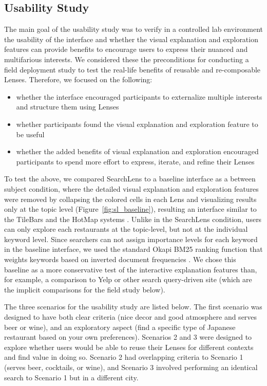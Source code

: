 \subsection{Usability Study}

The main goal of the usability study was to verify in a controlled lab environment the usability of the interface and whether the visual explanation and exploration features can provide benefits to encourage users to express their nuanced and multifarious interests. We considered these the preconditions for conducting a field deployment study to test the real-life benefits of reusable and re-composable Lenses. Therefore, we focused on the following:

\begin{itemize}

    \item whether the interface encouraged participants to externalize multiple interests and structure them using Lenses
    \item whether participants found the visual explanation and exploration feature to be useful 
    \item whether the added benefits of visual explanation and exploration encouraged participants to spend more effort to express, iterate, and refine their Lenses
\end{itemize}

To test the above, we compared SearchLens to a baseline interface as a between subject condition, where the detailed visual explanation and exploration features were removed by collapsing the colored cells in each Lens and visualizing results only at the topic level (Figure~\ref{fig:sl_baseline}), resulting an interface similar to the TileBars and the HotMap systems \cite{hearst1996visualizing, hoeber2006comparative}. Unlike in the SearchLens condition, users can only explore each restaurants at the topic-level, but not at the individual keyword level. Since searchers can not assign importance levels for each keyword in the baseline interface, we used the standard Okapi BM25 ranking function that weights keywords based on inverted document frequencies \cite{robertson2009probabilistic}. We chose this baseline as a more conservative test of the interactive explanation features than, for example, a comparison to Yelp or other search query-driven site (which are the implicit comparisons for the field study below).

The three scenarios for the usability study are listed below. The first scenario was designed to have both clear criteria (nice decor and good atmosphere and serves beer or wine), and an exploratory aspect (find a specific type of Japanese restaurant based on your own preferences). Scenarios 2 and 3 were designed to explore whether users would be able to reuse their Lenses for different contexts and find value in doing so. Scenario 2 had overlapping criteria to Scenario 1 (serves beer, cocktails, or wine), and Scenario 3 involved performing an identical search to Scenario 1 but in a different city.

